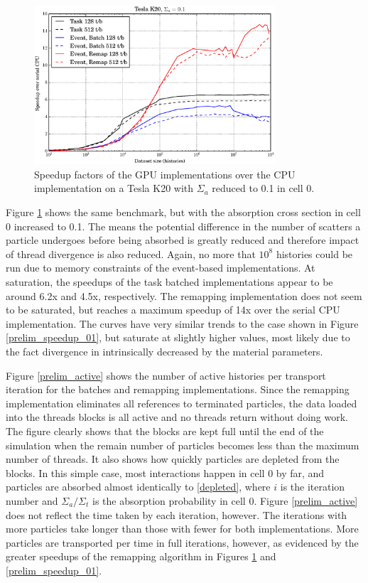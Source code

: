 \begin{figure}[h!] 
  \centering
    \includegraphics[width=0.8\textwidth]{graphics/prelim_speedup_01_k20.eps}
     \caption{Speedup factors of the GPU implementations over the CPU implementation on a Tesla K20 with $\Sigma_a$ reduced to 0.1 in cell 0. \label{prelim_speedup_1} }
\end{figure}

Figure \ref{prelim_speedup_1} shows the same benchmark, but with the absorption cross section in cell 0 increased to 0.1.  The means the potential difference in the number of scatters a particle undergoes before being absorbed is greatly reduced and therefore impact of thread divergence is also reduced.  Again, no more that $10^8$ histories could be run due to memory constraints of the event-based implementations.  At saturation, the speedups of the task batched implementations appear to be around 6.2x and 4.5x, respectively.  The remapping implementation does not seem to be saturated, but reaches a maximum speedup of 14x over the serial CPU implementation.  The curves have very similar trends to the case shown in Figure \ref{prelim_speedup_01}, but saturate at slightly higher values, most likely due to the fact divergence in intrinsically decreased by the material parameters.

Figure \ref{prelim_active} shows the number of active histories per transport iteration for the batches and remapping implementations.  Since the remapping implementation eliminates all references to terminated particles, the data loaded into the threads blocks is all active and no threads return without doing work.  The figure clearly shows that the blocks are kept full until the end of the simulation when the remain number of particles becomes less than the maximum number of threads.  It also shows how quickly particles are depleted from the blocks.  In this simple case, most interactions happen in cell 0 by far, and particles are absorbed almost identically to \eqref{depleted}, where $i$ is the iteration number and $\Sigma_a/\Sigma_t$ is the absorption probability in cell 0.   Figure \ref{prelim_active} does not reflect the time taken by each iteration, however.  The iterations with more particles take longer than those with fewer for both implementations.  More particles are transported per time in full iterations, however, as evidenced by the greater speedups of the remapping algorithm in Figures \ref{prelim_speedup_1} and \ref{prelim_speedup_01}.

